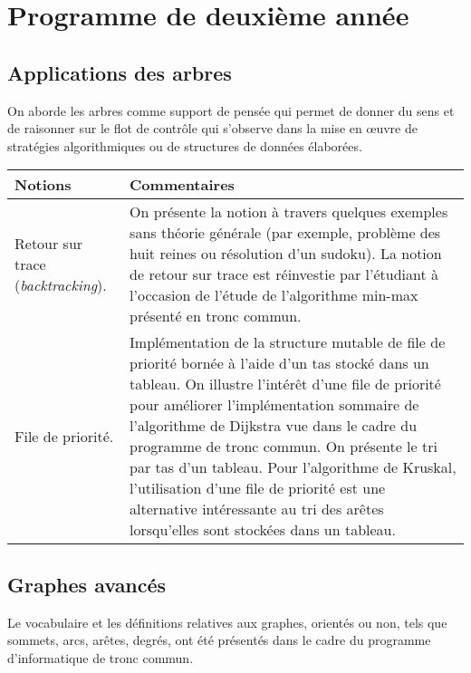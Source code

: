 \section{Programme de deuxième année}
    
\subsection{Applications des arbres}

On aborde les arbres comme support de pensée qui permet de donner du sens et de raisonner sur le flot de contrôle qui s'observe dans la mise en \oe uvre de stratégies algorithmiques ou de structures de données élaborées.

\begin{longtable}{|p{\lnotion}|p{\comment}|}
    \hline
    \textbf{Notions} & \textbf{Commentaires} \\
    \hline \hline
    Retour sur trace (\textit{backtracking}). & 
    On présente la notion à travers quelques exemples sans théorie générale (par exemple, problème des huit reines ou résolution d'un sudoku). La notion de retour sur trace est réinvestie par l'étudiant à l'occasion de l'étude de l'algorithme min-max présenté en tronc commun.
    \\ \hline
    File de priorité. &
    Implémentation de la structure
    mutable de file de priorité bornée à l'aide d'un tas
    stocké dans un tableau.
    On illustre l'intérêt d'une file de priorité pour améliorer l'implémentation sommaire de l'algorithme de Dijkstra vue dans le cadre du programme de tronc commun. On présente le tri par tas d'un tableau. Pour l'algorithme de Kruskal, l'utilisation d'une file de priorité est une alternative intéressante au tri des arêtes lorsqu'elles sont stockées dans un tableau.\\
    \hline
\end{longtable}


\subsection{Graphes avancés}

Le vocabulaire et les définitions relatives aux graphes, orientés ou non, tels que sommets, arcs, arêtes, degrés, ont été présentés dans le cadre du programme d'informatique de tronc commun.

